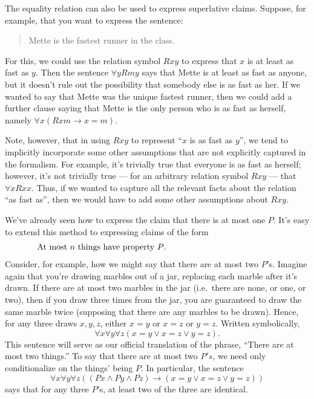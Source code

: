 The equality relation can also be used to express superlative claims.
Suppose, for example, that you want to express the sentence:
\begin{quote} Mette is the fastest runner in the class. \end{quote} For this, we could use the relation symbol $Rxy$
to express that $x$ is at least as fast as $y$.  Then
the sentence $\forall yRmy$ says that Mette is at least as fast as
anyone, but it doesn't rule out the possibility that somebody else is
as fast as her.  If we wanted to say that Mette was
the unique fastest runner, then we could add a further clause
saying that Mette is the only person who is as fast as herself,
namely $\forall x(Rxm\to x=m)$.

Note, however, that in using $Rxy$ to represent ``$x$ is as fast as
$y$'', we tend to implicitly incorporate some other assumptions that
are not explicitly captured in the formalism.  For example, it's
trivially true that everyone is as fast as herself; however, it's not
trivially true --- for an arbitrary relation symbol $Rxy$ --- that
$\forall xRxx$.  Thus, if we wanted to capture all the relevant facts
about the relation ``as fast as'', then we would have to add some
other assumptions about $Rxy$.

We've already seen how to express the claim that there is at most one
$P$.  It's easy to extend this method to expressing claims of the form 
\[ \begin{array}{p{10cm}}
  At most $n$ things have property $P$.  \end{array} \]
Consider, for example, how we might say that there are at most two
$P$'s.  Imagine again that you're drawing marbles out of a jar,
replacing each marble after it's drawn.  If there are at most two
marbles in the jar (i.e.\ there are none, or one, or two), then if you
draw three times from the jar, you are guaranteed to draw the same
marble twice (supposing that there are any marbles to be drawn).
Hence, for any three draws $x,y,z$, either $x=y$ or $x=z$ or $y=z$.
Written symbolically,
\[ \forall x\forall y\forall z(x=y\vee x=z\vee y=z) . \]
This sentence will serve as our official translation of the phrase,
``There are at most two things.''  To say that there are at most two
$P's$, we need only conditionalize on the things' being $P$.  In
particular, the sentence
\[ \forall x\forall y\forall z((Px\wedge Py\wedge Pz)\to (x=y\vee
  x=z\vee y=z)) \]
says that for any three $P$'s, at least two of the three are
identical.

